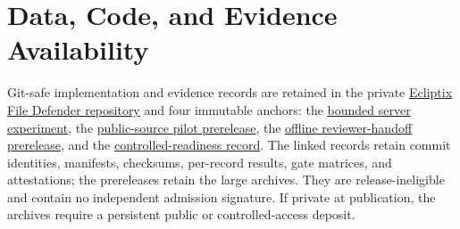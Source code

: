 \section*{Data, Code, and Evidence Availability}
\label{sec:data-availability}

\begingroup
\small
\raggedright
Git-safe implementation and evidence records are retained in the private
\href{https://github.com/oleksandrmelnychenko/ecliptix-file-defender}
{Ecliptix File Defender repository} and four immutable anchors: the
\href{https://github.com/oleksandrmelnychenko/ecliptix-file-defender/tree/823a5ec7a0dd56a5ba1c12a5aa45c77a4bff71c0/docs/research/rehearsals/20260720T130631Z-server-experiment-dcd6e114d21a}
{bounded server experiment}, the
\href{https://github.com/oleksandrmelnychenko/ecliptix-file-defender/releases/tag/evidence-public-source-pilot-20260724T215601Z-39bf19f1d17b-c44fdc45}
{public-source pilot prerelease}, the
\href{https://github.com/oleksandrmelnychenko/ecliptix-file-defender/releases/tag/evidence-public-source-review-handoff-20260725T231947Z-8aa55ef}
{offline reviewer-handoff prerelease}, and the
\href{https://github.com/oleksandrmelnychenko/ecliptix-file-defender/tree/a7d4e4c0425a0265d3438d6a2474acc72de0933d/docs/research/rehearsals/20260727T151107Z-50e0c8f-controlled-readiness}
{controlled-readiness record}. The linked records retain commit identities,
manifests, checksums, per-record results, gate matrices, and attestations; the
prereleases retain the large archives. They are release-ineligible and contain
no independent admission signature. If private at publication, the archives
require a persistent public or controlled-access deposit.
\par
\endgroup
